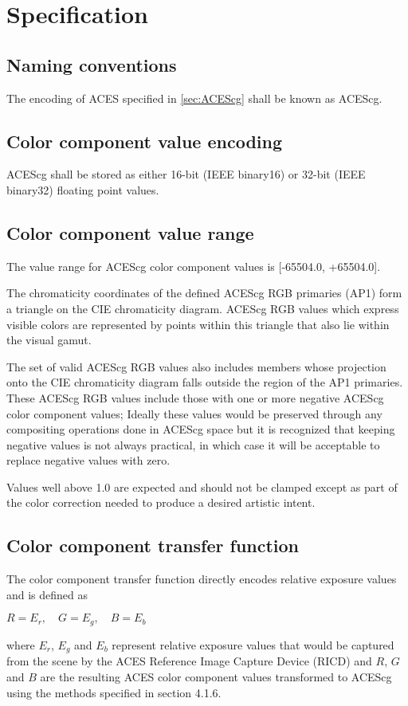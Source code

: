 \regularsectionformat	%
\chapter{Specification}

\section{Naming conventions}
The encoding of ACES specified in \autoref{sec:ACEScg} shall be known as ACEScg.

\section{Color component value encoding}
ACEScg shall be stored as either 16-bit (IEEE binary16) or 32-bit (IEEE binary32) floating point values.

\section{Color component value range}
The value range for ACEScg color component values is [-65504.0, +65504.0].

The chromaticity coordinates of the defined ACEScg RGB primaries (AP1) form a triangle on the CIE chromaticity diagram. ACEScg RGB values which express visible colors are represented by points within this triangle that also lie within the visual gamut.

The set of valid ACEScg RGB values also includes members whose projection onto the CIE chromaticity diagram falls outside the region of the AP1 primaries. These ACEScg RGB values include those with one or more negative ACEScg color component values; Ideally these values would be preserved through any compositing operations done in ACEScg space but it is recognized that keeping negative values is not always practical, in which case it will be acceptable to replace negative values with zero.

Values well above 1.0 are expected and should not be clamped except as part of the color correction needed to produce a desired artistic intent.

\section{Color component transfer function}
The color component transfer function directly encodes relative exposure values and is defined as
\begin{center}
$R = E_r, \quad G = E_g, \quad B = E_b$
\end{center}
where $E_r$, $E_g$ and $E_b$ represent relative exposure values that would be captured from the scene by the ACES Reference Image Capture Device (RICD) and $R$, $G$ and $B$ are the resulting ACES color component values transformed to ACEScg using the methods specified in section 4.1.6.

